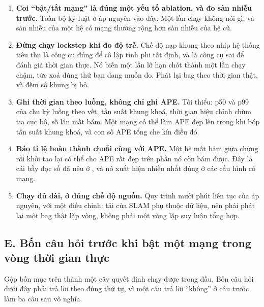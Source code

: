 \documentclass[../../deep_learning.tex]{subfiles}
\begin{document}
\begin{enumerate}
\item \textbf{Coi ``bật/tắt mạng'' là đúng một yếu tố ablation, và đo sàn nhiễu trước.} Toàn bộ kỷ luật ở  áp nguyên vào đây. Một lần chạy không nói gì, và sàn nhiễu của một hệ có mạng thường rộng hơn sàn nhiễu của hệ cũ.
\item \textbf{Đừng chạy lockstep khi đo độ trễ.} Chế độ nạp khung theo nhịp hệ thống tiêu thụ là công cụ đúng để cô lập tính phi tất định, và là công cụ sai để đánh giá thời gian thực. Nó biến một lần lỡ hạn chót thành một lần chạy chậm, tức xoá đúng thứ bạn đang muốn đo. Phát lại bag theo thời gian thật, và đếm số khung bị bỏ.
\item \textbf{Ghi thời gian theo luồng, không chỉ ghi APE.} Tối thiểu: p50 và p99 của chu kỳ luồng theo vết, tần suất khung khoá, thời gian hiệu chỉnh chùm tia cục bộ, số lần mất bám. Một mạng có thể làm APE đẹp lên trong khi bóp tần suất khung khoá, và con số APE tổng che kín điều đó.
\item \textbf{Báo tỉ lệ hoàn thành chuỗi cùng với APE.} Một hệ mất bám giữa chừng rồi khởi tạo lại có thể cho APE rất đẹp trên phần nó còn bám được. Đây là cái bẫy đọc số đã nêu ở , và nó xuất hiện nhiều nhất đúng ở các cấu hình có mạng.
\item \textbf{Chạy đủ dài, ở đúng chế độ nguồn.} Quy trình mười phút liên tục của  áp nguyên, với một điều chỉnh: tải của SLAM phụ thuộc dữ liệu, nên phải phát lại một bag thật lặp vòng, không phải một vòng lặp suy luận tổng hợp.
\end{enumerate}


\subsection{E. Bốn câu hỏi trước khi bật một mạng trong vòng thời gian thực}

Gộp bốn mục trên thành một cây quyết định chạy được trong đầu. Bốn câu hỏi dưới đây phải trả lời theo đúng thứ tự, vì một câu trả lời ``không'' ở câu trước làm ba câu sau vô nghĩa.
\end{document}
